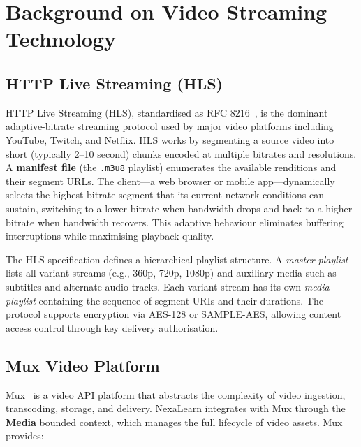 
\section{Background on Video Streaming Technology}
\label{sec:video-streaming}

\subsection{HTTP Live Streaming (HLS)}

HTTP Live Streaming (HLS), standardised as RFC 8216~\cite{pantos2022hls}, is the dominant adaptive-bitrate streaming protocol used by major video platforms including YouTube, Twitch, and Netflix. HLS works by segmenting a source video into short (typically 2--10 second) chunks encoded at multiple bitrates and resolutions. A \textbf{manifest file} (the \texttt{.m3u8} playlist) enumerates the available renditions and their segment URLs. The client---a web browser or mobile app---dynamically selects the highest bitrate segment that its current network conditions can sustain, switching to a lower bitrate when bandwidth drops and back to a higher bitrate when bandwidth recovers. This adaptive behaviour eliminates buffering interruptions while maximising playback quality.

The HLS specification defines a hierarchical playlist structure. A \textit{master playlist} lists all variant streams (e.g., 360p, 720p, 1080p) and auxiliary media such as subtitles and alternate audio tracks. Each variant stream has its own \textit{media playlist} containing the sequence of segment URIs and their durations. The protocol supports encryption via AES-128 or SAMPLE-AES, allowing content access control through key delivery authorisation.

\subsection{Mux Video Platform}

Mux~\cite{mux2024} is a video API platform that abstracts the complexity of video ingestion, transcoding, storage, and delivery. NexaLearn integrates with Mux through the \textbf{Media} bounded context, which manages the full lifecycle of video assets. Mux provides:

